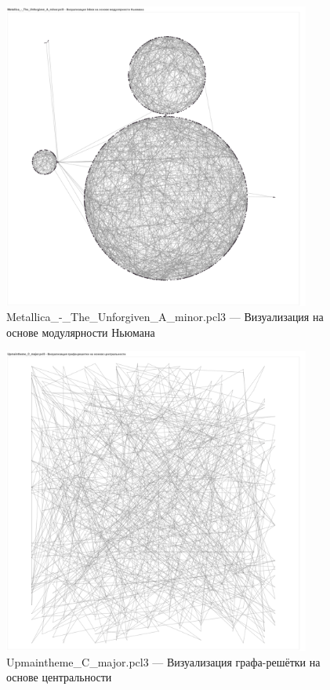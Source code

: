 \documentclass[a4paper,oneside,14pt]{extarticle}
\begin{document}
\begin{figure}[H]
	\centering
	\includegraphics[width=0.9\textwidth]{img/metallica-newmann.pdf}
	\caption{Metallica\_-\_The\_Unforgiven\_A\_minor.pcl3 --- Визуализация на основе модулярности Ньюмана}
	\label{fig:}
\end{figure}

\begin{figure}[H]
	\centering
	\includegraphics[width=0.9\textwidth]{img/up-lattice.pdf}
	\caption{Upmaintheme\_C\_major.pcl3 --- Визуализация графа-решётки на основе центральности}
	\label{fig:}
\end{figure}
\end{document}
